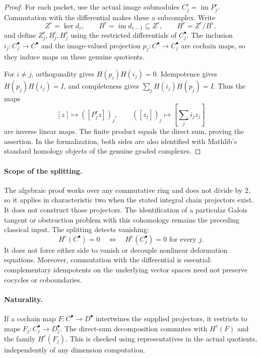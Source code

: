 \documentclass[11pt]{article}
\theoremstyle{definition}
\theoremstyle{remark}
\begin{document}
\begin{proof}
For each packet, use the actual image submodules
\(C_j^r=\operatorname{im}P_j^r\). Commutation with the differential
makes these a subcomplex. Write
\[
Z^r=\ker d_r,\qquad B^r=\operatorname{im}d_{r-1}\subseteq Z^r,
\qquad H^r=Z^r/B^r,
\]
and define \(Z_j^r,B_j^r,H_j^r\) using the restricted differentials of
\(C_j^\bullet\). The inclusion \(i_j:C_j^\bullet\to C^\bullet\)
and the image-valued projection \(p_j:C^\bullet\to C_j^\bullet\)
are cochain maps, so they induce maps on these genuine quotients.

For \(i\ne j\), orthogonality gives
\(H(p_i)H(i_j)=0\). Idempotence gives
\(H(p_j)H(i_j)=I\), and completeness gives
\(\sum_j H(i_j)H(p_j)=I\). Thus the maps
\[
[z]\longmapsto([P_j^r z])_j,
\qquad
([z_j])_j\longmapsto\left[\sum_j i_j z_j\right]
\]
are inverse linear maps. The finite product equals the direct sum, proving
the assertion. In the formalization, both sides are also identified with
Mathlib's standard homology objects of the genuine graded complexes.
\end{proof}

\paragraph{Scope of the splitting.}
The algebraic proof works over any commutative ring and does not divide by
\(2\), so it applies in characteristic two when the stated integral
chain projectors exist. It does not construct those projectors. The
identification of a particular Galois tangent or obstruction problem with
this cohomology remains the preceding classical input.
The splitting detects vanishing:
\[
H^r(C^\bullet)=0\quad\Longleftrightarrow\quad
H^r(C_j^\bullet)=0\text{ for every }j.
\]
It does not force either side to vanish or decouple nonlinear deformation
equations. Moreover, commutation with the differential is essential:
complementary idempotents on the underlying vector spaces need not
preserve cocycles or coboundaries.

\paragraph{Naturality.}
If a cochain map \(F:C^\bullet\to D^\bullet\) intertwines the supplied
projectors, it restricts to maps \(F_j:C_j^\bullet\to D_j^\bullet\).
The direct-sum decomposition commutes with \(H^r(F)\) and the family
\(H^r(F_j)\). This is checked using representatives in the actual
quotients, independently of any dimension computation.
\end{document}
